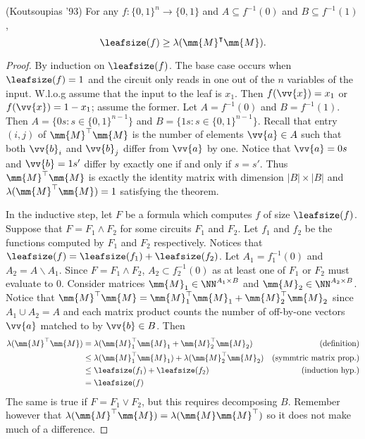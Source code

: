 \begin{theorem}
	(Koutsoupias '93) For any $f: \{0, 1\}^n \rightarrow \{0,1\}$ and $A \subseteq f^{-1}(0)$ and $B \subseteq f^{-1}(1)$,
	\[\leafsize(f) \geq \lambda(\mm{M}^{\intercal}\mm{M}).\]
\end{theorem}
\begin{proof}
	By induction on $\leafsize(f)$. The base case occurs when $\leafsize(f) = 1$ and the circuit only reads in one out of the $n$ variables of the input. W.l.o.g assume that the input to the leaf is $x_1$. Then $f(\vv{x}) = x_1$ or $f(\vv{x}) = 1 - x_1$; assume the former. Let $A = f^{-1}(0)$ and $B = f^{-1}(1)$. Then $A = \{0s: s \in \{0,1\}^{n-1}\}$ and $B = \{1s: s \in \{0,1\}^{n-1}\}$. Recall that entry $(i,j)$ of $\mm{M}^{\top}\mm{M}$ is the number of elements $\vv{a} \in A$ such that both $\vv{b}_i$ and $\vv{b}_j$ differ from $\vv{a}$ by one. Notice that $\vv{a} = 0s$ and $\vv{b} = 1s'$ differ by exactly one if and only if $s = s'$. Thus $\mm{M}^{\top}\mm{M}$ is exactly the identity matrix with dimension $|B| \times |B|$ and $\lambda(\mm{M}^{\top}\mm{M}) = 1$ satisfying the theorem.  
	
	In the inductive step, let $F$ be a formula which computes $f$ of size $\leafsize(f)$. Suppose that $F = F_1 \land F_2$ for some circuits $F_1$ and $F_2$. Let $f_1$ and $f_2$ be the functions computed by $F_1$ and $F_2$ respectively. Notices that $\leafsize(f) = \leafsize(f_1) + \leafsize(f_2)$. Let $A_1 = f_1^{-1}(0)$ and $A_2 = A \backslash A_1$. Since $F = F_1 \land F_2$, $A_2 \subset f_2^{-1}(0)$ as at least one of $F_1$ or $F_2$ must evaluate to $0$. Consider matrices $\mm{M}_1 \in \NN^{A_1 \times B}$ and $\mm{M}_2 
	\in \NN^{A_2 \times B}$. Notice that $\mm{M}^{\top}\mm{M} = \mm{M}_1^{\top}\mm{M}_1 + \mm{M}_2^{\top}\mm{M}_2$ since $A_1 \cup A_2 = A$ and each matrix product counts the number of off-by-one vectors $\vv{a}$ matched to by $\vv{b} \in B$. Then
	\begin{align*}
		\lambda(\mm{M}^{\top}\mm{M}) &= \lambda(\mm{M}_1^{\top}\mm{M}_1 + \mm{M}_2^{\top}\mm{M}_2) &\mbox{(definition)}\\
		&\leq \lambda(\mm{M}_1^{\top}\mm{M}_1) + \lambda(\mm{M}_2^{\top}\mm{M}_2) &\mbox{(symmtric matrix prop.)}\\ 
		&\leq \leafsize(f_1) + \leafsize(f_2) &\mbox{(induction hyp.)}\\ 
		&= \leafsize(f)
	\end{align*} 
	The same is true if $F = F_1 \lor F_2$, but this requires decomposing $B$. Remember however that $\lambda(\mm{M}^{\top}\mm{M}) = \lambda(\mm{M}\mm{M}^{\top})$ so it does not make much of a difference.
\end{proof}

